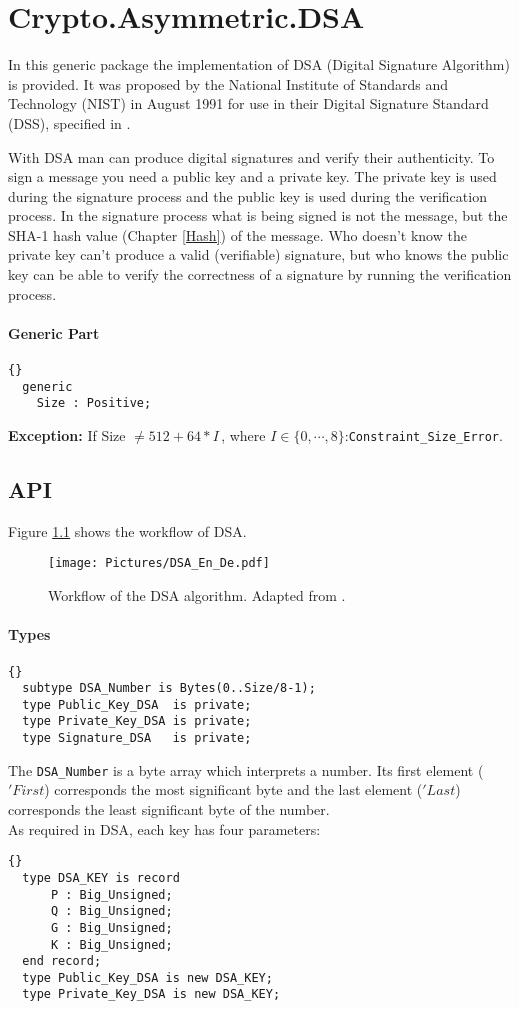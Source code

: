 \chapter{Crypto.Asymmetric.DSA}
In this generic package the implementation of DSA (Digital Signature Algorithm) is provided. It was proposed by the National Institute of Standards and Technology (NIST) in August 1991 for use in their Digital Signature Standard (DSS), specified in \cite{DSA-FIPS}.

With DSA man can produce digital signatures and verify their authenticity. To sign a message you need a public key and a private key. The private key is used during the signature process and the public key is used during the verification process. In the signature process what is being signed is not the message, but the SHA-1 hash value (Chapter \ref{Hash}) of the message. Who doesn't know the private key can't produce a valid (verifiable) signature, but who knows the public key can be able to verify the correctness of a signature by running the verification process.
\subsubsection*{Generic Part}
\begin{lstlisting}{}
  generic
    Size : Positive;
\end{lstlisting}
\textbf{Exception:} If Size $\neq 512+64*I$\,, where $I\in\{0,\cdots,8\}$:\quad \texttt{Constraint\_Size\_Error}.\\
\section{API}
Figure \ref{StructureDSA} shows the workflow of DSA.
\begin{figure}[h]
\centering
\texttt{[image: Pictures/DSA\_En\_De.pdf]} 
\caption{Workflow of the DSA algorithm. Adapted from \cite{DSA-FIPS}.}\label{StructureDSA}
\end{figure}
\subsubsection*{Types}
\begin{lstlisting}{}
  subtype DSA_Number is Bytes(0..Size/8-1);
  type Public_Key_DSA  is private;
  type Private_Key_DSA is private;
  type Signature_DSA   is private;
\end{lstlisting}
The \texttt{DSA\_Number} is a byte array which interprets a number. Its first element ($'First$) corresponds the most significant byte and the last element ($'Last$) corresponds the least significant byte of the number.\\
As required in DSA, each key has four parameters:
\begin{lstlisting}{}
  type DSA_KEY is record
      P : Big_Unsigned;
      Q : Big_Unsigned;
      G : Big_Unsigned;
      K : Big_Unsigned; 
  end record;
  type Public_Key_DSA is new DSA_KEY;
  type Private_Key_DSA is new DSA_KEY;
\end{lstlisting}\\
